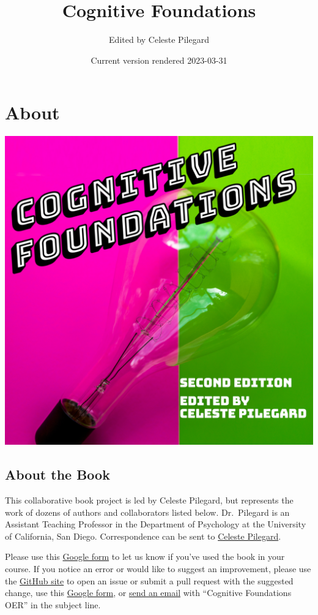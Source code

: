 \documentclass[
]{krantz}
\title{Cognitive Foundations}
\author{Edited by Celeste Pilegard}
\date{Current version rendered 2023-03-31}
\begin{document}
\maketitle

{
\setcounter{tocdepth}{1}
\tableofcontents
}
\hypertarget{about}{%
\chapter*{About}\label{about}}


\includegraphics{images/cover.png}

\hypertarget{about-the-book}{%
\section*{About the Book}\label{about-the-book}}


This collaborative book project is led by Celeste Pilegard, but represents the work of dozens of authors and collaborators listed below. Dr.~Pilegard is an Assistant Teaching Professor in the Department of Psychology at the University of California, San Diego. Correspondence can be sent to \href{mailto:pilegard@ucsd.edu}{Celeste Pilegard}.

Please use this \href{https://forms.gle/83CBvAgLuJshRfz37}{Google form} to let us know if you've used the book in your course. If you notice an error or would like to suggest an improvement, please use the \href{https://github.com/pilegard/cogfoundations}{GitHub site} to open an issue or submit a pull request with the suggested change, use this \href{https://forms.gle/83CBvAgLuJshRfz37}{Google form}, or \href{mailto:pilegard@ucsd.edu}{send an email} with ``Cognitive Foundations OER'' in the subject line.
\end{document}
